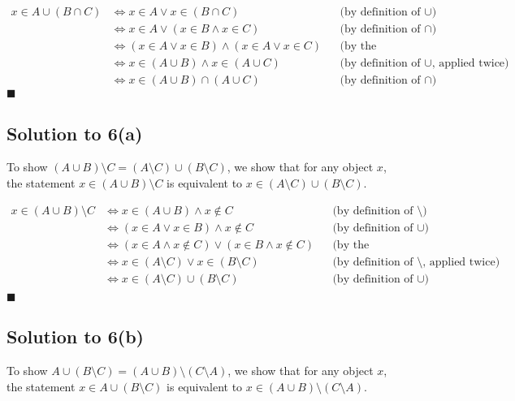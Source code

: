 \documentclass{scrartcl}
\begin{document}
    \begin{align*}
        x \in A \cup (B \cap C)
        &\Leftrightarrow x \in A \vee x \in (B \cap C)
        && \text{(by definition of $\cup$)} \\
        &\Leftrightarrow x \in A \vee (x \in B \wedge x \in C)
        && \text{(by definition of $\cap$)} \\
        &\Leftrightarrow (x \in A \vee x \in B) \wedge (x \in A \vee x \in C)
        && \text{(by the Distributive Law)} \\
        &\Leftrightarrow x \in (A \cup B) \wedge x \in (A \cup C)
        && \text{(by definition of $\cup$, applied twice)} \\
        &\Leftrightarrow x \in (A \cup B) \cap (A \cup C)
        && \text{(by definition of $\cap$)}
    \end{align*}
    \hfill $\blacksquare$

    \subsection*{Solution to 6(a)}
    To show $(A \cup B) \setminus C = (A \setminus C) \cup (B \setminus C)$, we show that for any object $x$, \\
    the statement $x \in (A \cup B) \setminus C$ is equivalent to $x \in (A \setminus C) \cup (B \setminus C)$.

    \begin{align*}
        x \in (A \cup B) \setminus C
        &\Leftrightarrow x \in (A \cup B) \wedge x \notin C 
        && \text{(by definition of $\setminus$)} \\
        &\Leftrightarrow (x \in A \vee x \in B) \wedge x \notin C
        && \text{(by definition of $\cup$)} \\
        &\Leftrightarrow  (x \in A \wedge x \notin C) \vee (x \in B \wedge x \notin C)
        && \text{(by the Distributive Law)} \\
        &\Leftrightarrow  x \in (A \setminus C) \vee x \in (B \setminus C)
        && \text{(by definition of $\setminus$, applied twice)} \\
        &\Leftrightarrow  x \in (A \setminus C) \cup (B \setminus C)
        && \text{(by definition of $\cup$)} \\
    \end{align*}
    \hfill $\blacksquare$

    \subsection*{Solution to 6(b)}
        To show $A \cup (B \setminus C) = (A \cup B) \setminus (C \setminus A)$, we show that for any object $x$, \\
        the statement $x \in A \cup (B \setminus C)$ is equivalent to $x \in (A \cup B) \setminus (C \setminus A)$.
\end{document}
